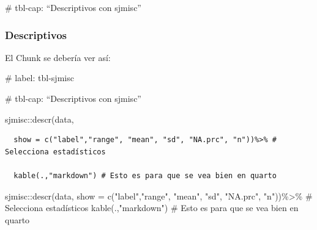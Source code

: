 \documentclass[
  letterpaper,
  DIV=11,
  numbers=noendperiod]{scrartcl}
\newenvironment{Shaded}{\begin{snugshade}}{\end{snugshade}}
\newcommand{\AttributeTok}[1]{\textcolor[rgb]{0.40,0.45,0.13}{#1}}
\newcommand{\CommentTok}[1]{\textcolor[rgb]{0.37,0.37,0.37}{#1}}
\newcommand{\FunctionTok}[1]{\textcolor[rgb]{0.28,0.35,0.67}{#1}}
\newcommand{\NormalTok}[1]{\textcolor[rgb]{0.00,0.23,0.31}{#1}}
\newcommand{\SpecialCharTok}[1]{\textcolor[rgb]{0.37,0.37,0.37}{#1}}
\newcommand{\StringTok}[1]{\textcolor[rgb]{0.13,0.47,0.30}{#1}}
\begin{document}
\#\textbar{} tbl-cap: ``Descriptivos con sjmisc''

\subsubsection{Descriptivos}\label{descriptivos}

El Chunk se debería ver así:

\#\textbar{} label: tbl-sjmisc

\#\textbar{} tbl-cap: ``Descriptivos con sjmisc''

sjmisc::descr(data,

\begin{verbatim}
  show = c("label","range", "mean", "sd", "NA.prc", "n"))%>% # Selecciona estadísticos

  kable(.,"markdown") # Esto es para que se vea bien en quarto
\end{verbatim}

\begin{Shaded}
\begin{Highlighting}[]
\NormalTok{sjmisc}\SpecialCharTok{::}\FunctionTok{descr}\NormalTok{(data,}
      \AttributeTok{show =} \FunctionTok{c}\NormalTok{(}\StringTok{"label"}\NormalTok{,}\StringTok{"range"}\NormalTok{, }\StringTok{"mean"}\NormalTok{, }\StringTok{"sd"}\NormalTok{, }\StringTok{"NA.prc"}\NormalTok{, }\StringTok{"n"}\NormalTok{))}\SpecialCharTok{\%\textgreater{}\%} \CommentTok{\# Selecciona estadísticos}
      \FunctionTok{kable}\NormalTok{(.,}\StringTok{"markdown"}\NormalTok{) }\CommentTok{\# Esto es para que se vea bien en quarto}
\end{Highlighting}
\end{Shaded}
\end{document}
